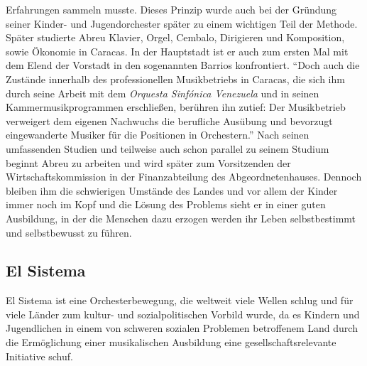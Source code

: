 Erfahrungen sammeln musste. Dieses Prinzip wurde auch bei der Gründung seiner
Kinder- und Jugendorchester später zu einem wichtigen Teil der Methode. Später
studierte Abreu Klavier, Orgel, Cembalo, Dirigieren und Komposition, sowie
Ökonomie in Caracas. In der Hauptstadt ist er auch zum ersten Mal mit dem Elend
der Vorstadt in den sogenannten Barrios konfrontiert. \enquote{Doch auch die
Zustände innerhalb des professionellen Musikbetriebs in Caracas, die sich ihm
durch seine Arbeit mit dem \emph{Orquesta Sinfónica Venezuela} und in seinen
Kammermusikprogrammen erschließen, berühren ihn zutief: Der Musikbetrieb
verweigert dem eigenen Nachwuchs die berufliche Ausübung und bevorzugt
eingewanderte Musiker für die Positionen in
Orchestern.}\autocite[28]{kaufmann:el_sistema} Nach seinen umfassenden Studien
und teilweise auch schon parallel zu seinem Studium beginnt Abreu zu arbeiten und wird später zum
Vorsitzenden der Wirtschaftskommission in der Finanzabteilung des
Abgeordnetenhauses. Dennoch bleiben ihm die schwierigen Umstände des Landes und
vor allem der Kinder immer noch im Kopf und die Lösung des Problems sieht er in
einer guten Ausbildung, in der die Menschen dazu erzogen werden ihr Leben
selbstbestimmt und selbstbewusst zu führen.\autocite[31]{kaufmann:el_sistema} 



\subsection{El Sistema}

El Sistema ist eine Orchesterbewegung, die weltweit viele Wellen schlug und für
viele Länder zum kultur- und sozialpolitischen Vorbild wurde, da es Kindern und
Jugendlichen in einem von schweren sozialen Problemen betroffenem Land durch die
Ermöglichung einer musikalischen Ausbildung eine gesellschaftsrelevante
Initiative schuf. 

